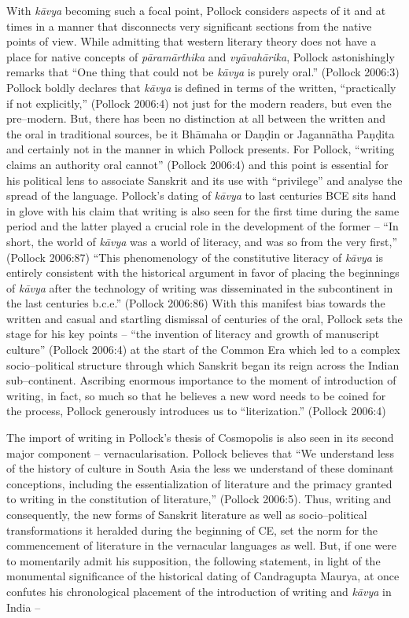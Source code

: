With \textit{kāvya} becoming such a focal point, Pollock considers aspects of it and at times in a manner that disconnects very significant sections from the native points of view. While admitting that western literary theory does not have a place for native concepts of \textit{pāramārthika} and \textit{vyāvahārika}, Pollock astonishingly remarks that “One thing that could not be \textit{kāvya} is purely oral.” (Pollock 2006:3) Pollock boldly declares that \textit{kāvya} is defined in terms of the written, “practically if not explicitly,” (Pollock 2006:4) not just for the modern readers, but even the pre–modern. But, there has been no distinction at all between the written and the oral in traditional sources, be it Bhāmaha or Daṇḍin or Jagannātha Paṇḍita and certainly not in the manner in which Pollock presents. For Pollock, “writing claims an authority oral cannot” (Pollock 2006:4) and this point is essential for his political lens to associate Sanskrit and its use with “privilege” and analyse the spread of the language. Pollock’s dating of \textit{kāvya} to last centuries BCE sits hand in glove with his claim that writing is also seen for the first time during the same period and the latter played a crucial role in the development of the former – “In short, the world of \textit{kāvya} was a world of literacy, and was so from the very first,” (Pollock 2006:87) “This phenomenology of the constitutive literacy of \textit{kāvya} is entirely consistent with the historical argument in favor of placing the beginnings of \textit{kāvya} after the technology of writing was disseminated in the subcontinent in the last centuries b.c.e.” (Pollock 2006:86) With this manifest bias towards the written and casual and startling dismissal of centuries of the oral, Pollock sets the stage for his key points – “the invention of literacy and growth of manuscript culture” (Pollock 2006:4) at the start of the Common Era which led to a complex socio–political structure through which Sanskrit began its reign across the Indian sub–continent. Ascribing enormous importance to the moment of introduction of writing, in fact, so much so that he believes a new word needs to be coined for the process, Pollock generously introduces us to “literization.” (Pollock 2006:4)

The import of writing in Pollock’s thesis of Cosmopolis is also seen in its second major component – vernacularisation. Pollock believes that “We understand less of the history of culture in South Asia the less we understand of these dominant conceptions, including the essentialization of literature and the primacy granted to writing in the constitution of literature,” (Pollock 2006:5). Thus, writing and consequently, the new forms of Sanskrit literature as well as socio–political transformations it heralded during the beginning of CE, set the norm for the commencement of literature in the vernacular languages as well. But, if one were to momentarily admit his supposition, the following statement, in light of the monumental significance of the historical dating of Candragupta Maurya, at once confutes his chronological placement of the introduction of writing and \textit{kāvya} in India –

